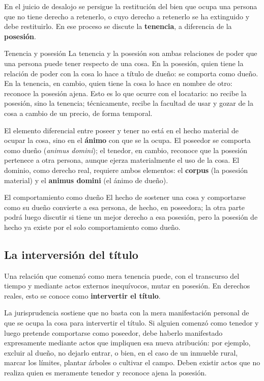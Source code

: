 \documentclass[12pt,oneside]{book}
\begin{document}
En el juicio de desalojo se persigue la restitución del bien que ocupa una persona que no tiene derecho a retenerlo, o cuyo derecho a retenerlo se ha extinguido y debe restituirlo. En ese proceso se discute la \textbf{tenencia}, a diferencia de la \textbf{posesión}.

\begin{definition}{Tenencia y posesión}
La tenencia y la posesión son ambas relaciones de poder que una persona puede tener respecto de una cosa. En la posesión, quien tiene la relación de poder con la cosa lo hace a título de dueño: se comporta como dueño. En la tenencia, en cambio, quien tiene la cosa lo hace en nombre de otro: reconoce la posesión ajena. Esto es lo que ocurre con el locatario: no recibe la posesión, sino la tenencia; técnicamente, recibe la facultad de usar y gozar de la cosa a cambio de un precio, de forma temporal.
\end{definition}

\begin{important}
El elemento diferencial entre poseer y tener no está en el hecho material de ocupar la cosa, sino en el \textbf{ánimo} con que se la ocupa. El poseedor se comporta como dueño (\textit{animus domini}); el tenedor, en cambio, reconoce que la posesión pertenece a otra persona, aunque ejerza materialmente el uso de la cosa. El dominio, como derecho real, requiere ambos elementos: el \textbf{corpus} (la posesión material) y el \textbf{animus domini} (el ánimo de dueño).
\end{important}

\begin{example}{El comportamiento como dueño}
El hecho de sostener una cosa y comportarse como su dueño convierte a esa persona, de hecho, en poseedora; la otra parte podrá luego discutir si tiene un mejor derecho a esa posesión, pero la posesión de hecho ya existe por el solo comportamiento como dueño.
\end{example}

\subsection{La interversión del título}

Una relación que comenzó como mera tenencia puede, con el transcurso del tiempo y mediante actos externos inequívocos, mutar en posesión. En derechos reales, esto se conoce como \textbf{intervertir el título}.

\begin{note}
La jurisprudencia sostiene que no basta con la mera manifestación personal de que se ocupa la cosa para intervertir el título. Si alguien comenzó como tenedor y luego pretende comportarse como poseedor, debe haberlo manifestado expresamente mediante actos que impliquen esa nueva atribución: por ejemplo, excluir al dueño, no dejarlo entrar, o bien, en el caso de un inmueble rural, marcar los límites, plantar árboles o cultivar el campo. Deben existir actos que no realiza quien es meramente tenedor y reconoce ajena la posesión.
\end{note}
\end{document}

